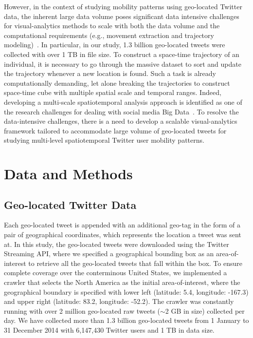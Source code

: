 \documentclass[ijgi,article,accept,moreauthors,pdftex,10pt,a4paper]{mdpi}
\theoremstyle{mdpi}
\newcounter{ex}
\newcounter{re}
\theoremstyle{mdpidefinition}
\begin{document}
However, in the context of studying mobility patterns using geo-located Twitter data, the inherent large data volume poses significant data intensive challenges for visual-analytics methods to scale with both the data volume and the computational requirements (e.g., movement extraction and trajectory modeling)~\cite{cao2014scalable}.
In particular, in our study, 1.3 billion geo-located tweets were collected with over 1 TB in file size.
To construct a space-time trajectory of an individual, it is necessary to go through the massive dataset to sort and update the trajectory whenever a new location is found.
Such a task is already computationally demanding, let alone breaking the trajectories to construct space-time cube with multiple spatial scale and temporal ranges.
Indeed, developing a multi-scale spatiotemporal analysis approach is identified as one of the research challenges for dealing with social media Big Data~\cite{tsou2015}.
To resolve the data-intensive challenges, there is a need to develop a scalable visual-analytics framework tailored to accommodate large volume of geo-located tweets for studying multi-level spatiotemporal Twitter user mobility patterns.


\section{Data and Methods}
\subsection{Geo-located Twitter Data}
Each geo-located tweet is appended with an additional geo-tag in the form of a pair of geographical coordinates, which represents the location a tweet was sent at.
In this study, the geo-located tweets were downloaded using the Twitter Streaming API, where we specified a geographical bounding box as an area-of-interest to retrieve all the geo-located tweets that fall within the box.
To ensure complete coverage over the conterminous United States, we implemented a crawler that selects the North America as the initial area-of-interest, where the geographical boundary is specified with lower left (latitude: 5.4, longitude: -167.3) and upper right (latitude: 83.2, longitude: -52.2).
The crawler was constantly running with over 2 million geo-located raw tweets ($\sim$2 GB in size) collected per day.
We have collected more than 1.3 billion geo-located tweets from 1 January to 31 December 2014 with 6,147,430 Twitter users and 1 TB in data size.
\end{document}
